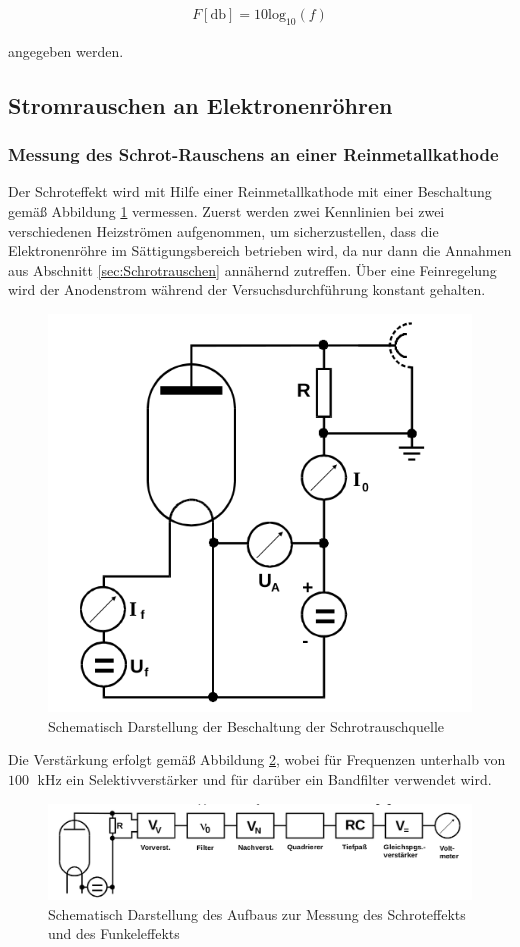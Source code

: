\begin{align}
F[ \textrm{db} ] = 10 \textrm{log}_{10}(f)
\end{align}

angegeben werden.

\subsection{Stromrauschen an Elektronenröhren}
\subsubsection{Messung des Schrot-Rauschens an einer Reinmetallkathode}
Der Schroteffekt wird mit Hilfe einer Reinmetallkathode mit einer Beschaltung gemäß Abbildung \ref{FIG:SchrotRauschquelle} vermessen. Zuerst werden zwei Kennlinien bei zwei verschiedenen Heizströmen aufgenommen, um sicherzustellen, dass die Elektronenröhre im Sättigungsbereich betrieben wird, da nur dann die Annahmen aus Abschnitt \ref{sec:Schrotrauschen} annähernd zutreffen. Über eine Feinregelung wird der Anodenstrom während der Versuchsdurchführung konstant gehalten.

\begin{figure}[htbp]
	\centering
	\includegraphics[width=0.5\linewidth,height=0.5\textheight,keepaspectratio]{bilder/SchrotRauschquelle.png}
	\caption{Schematisch Darstellung der Beschaltung der Schrotrauschquelle \cite{Anl}}
	\label{FIG:SchrotRauschquelle}
\end{figure}

Die Verstärkung erfolgt gemäß Abbildung \ref{FIG:SchrotRauschenMessaufbau}, wobei für Frequenzen unterhalb von $100\;$ kHz ein Selektivverstärker und für darüber ein Bandfilter verwendet wird.

\begin{figure}[htbp]
	\centering
	\includegraphics[width=0.7\linewidth,height=0.5\textheight,keepaspectratio]{bilder/SchrotRauschenMessaufbau.png}
	\caption{Schematisch Darstellung des Aufbaus zur Messung des Schroteffekts und des Funkeleffekts \cite{Anl}}
	\label{FIG:SchrotRauschenMessaufbau}
\end{figure}

